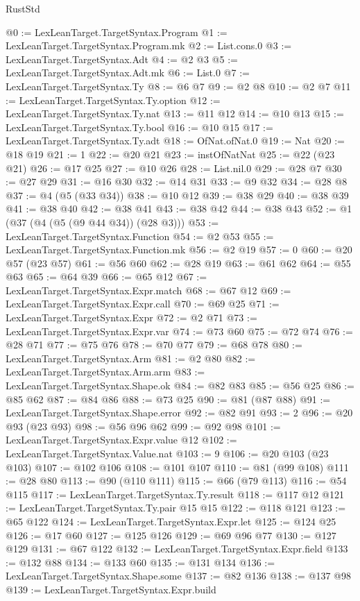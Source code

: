 \begin{lexlean}{RustStd}
\begin{coremodule}
@0 := LexLeanTarget.TargetSyntax.Program
@1 := LexLeanTarget.TargetSyntax.Program.mk
@2 := List.cons.{0}
@3 := LexLeanTarget.TargetSyntax.Adt
@4 := @2 @3
@5 := LexLeanTarget.TargetSyntax.Adt.mk
@6 := List.{0}
@7 := LexLeanTarget.TargetSyntax.Ty
@8 := @6 @7
@9 := @2 @8
@10 := @2 @7
@11 := LexLeanTarget.TargetSyntax.Ty.option
@12 := LexLeanTarget.TargetSyntax.Ty.nat
@13 := @11 @12
@14 := @10 @13
@15 := LexLeanTarget.TargetSyntax.Ty.bool
@16 := @10 @15
@17 := LexLeanTarget.TargetSyntax.Ty.adt
@18 := OfNat.ofNat.{0}
@19 := Nat
@20 := @18 @19
@21 := 1
@22 := @20 @21
@23 := instOfNatNat
@25 := @22 (@23 @21)
@26 := @17 @25
@27 := @10 @26
@28 := List.nil.{0}
@29 := @28 @7
@30 := @27 @29
@31 := @16 @30
@32 := @14 @31
@33 := @9 @32
@34 := @28 @8
@37 := @4 (@5 (@33 @34))
@38 := @10 @12
@39 := @38 @29
@40 := @38 @39
@41 := @38 @40
@42 := @38 @41
@43 := @38 @42
@44 := @38 @43
@52 := @1 (@37 (@4 (@5 (@9 @44 @34)) (@28 @3)))
@53 := LexLeanTarget.TargetSyntax.Function
@54 := @2 @53
@55 := LexLeanTarget.TargetSyntax.Function.mk
@56 := @2 @19
@57 := 0
@60 := @20 @57 (@23 @57)
@61 := @56 @60
@62 := @28 @19
@63 := @61 @62
@64 := @55 @63
@65 := @64 @39
@66 := @65 @12
@67 := LexLeanTarget.TargetSyntax.Expr.match
@68 := @67 @12
@69 := LexLeanTarget.TargetSyntax.Expr.call
@70 := @69 @25
@71 := LexLeanTarget.TargetSyntax.Expr
@72 := @2 @71
@73 := LexLeanTarget.TargetSyntax.Expr.var
@74 := @73 @60
@75 := @72 @74
@76 := @28 @71
@77 := @75 @76
@78 := @70 @77
@79 := @68 @78
@80 := LexLeanTarget.TargetSyntax.Arm
@81 := @2 @80
@82 := LexLeanTarget.TargetSyntax.Arm.arm
@83 := LexLeanTarget.TargetSyntax.Shape.ok
@84 := @82 @83
@85 := @56 @25
@86 := @85 @62
@87 := @84 @86
@88 := @73 @25
@90 := @81 (@87 @88)
@91 := LexLeanTarget.TargetSyntax.Shape.error
@92 := @82 @91
@93 := 2
@96 := @20 @93 (@23 @93)
@98 := @56 @96 @62
@99 := @92 @98
@101 := LexLeanTarget.TargetSyntax.Expr.value @12
@102 := LexLeanTarget.TargetSyntax.Value.nat
@103 := 9
@106 := @20 @103 (@23 @103)
@107 := @102 @106
@108 := @101 @107
@110 := @81 (@99 @108)
@111 := @28 @80
@113 := @90 (@110 @111)
@115 := @66 (@79 @113)
@116 := @54 @115
@117 := LexLeanTarget.TargetSyntax.Ty.result
@118 := @117 @12
@121 := LexLeanTarget.TargetSyntax.Ty.pair @15 @15
@122 := @118 @121
@123 := @65 @122
@124 := LexLeanTarget.TargetSyntax.Expr.let
@125 := @124 @25
@126 := @17 @60
@127 := @125 @126
@129 := @69 @96 @77
@130 := @127 @129
@131 := @67 @122
@132 := LexLeanTarget.TargetSyntax.Expr.field
@133 := @132 @88
@134 := @133 @60
@135 := @131 @134
@136 := LexLeanTarget.TargetSyntax.Shape.some
@137 := @82 @136
@138 := @137 @98
@139 := LexLeanTarget.TargetSyntax.Expr.build

\end{coremodule}
\end{lexlean}

